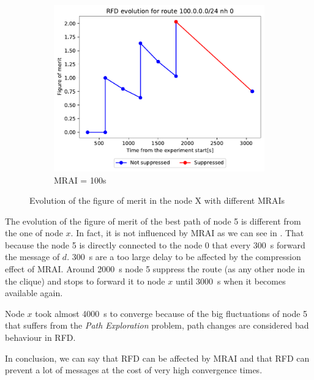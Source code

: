 \begin{figure}[h]
\begin{subfigure}[b]{0.3\textwidth}
     \end{subfigure}
     \hfill
     \begin{subfigure}[b]{0.3\textwidth}
         \centering
         \includegraphics[width=\textwidth]{images/RFD/clique/FigureOfMerit/mrai21_RFD_5_rfd_R1.pdf}
         \caption{MRAI = 100s}
         \label{fig:clique_5_mrai100}
     \end{subfigure}
        \caption{Evolution of the figure of merit in the node X with different MRAIs}
        \label{fig:clique_node5}
\end{figure}

The evolution of the figure of merit of the best path of node \num{5} is different
from the one of node $x$.
In fact, it is not influenced by \ac{MRAI} as we can see in .
That because the node \num{5} is directly connected to the node \num{0} that every
\SI{300}{\second} forward the message of $d$. \SI{300}{\second} are a too large
delay to be affected by the compression effect of \ac{MRAI}.
Around \SI{2000}{\second} node \num{5} suppress the route (as any other node in the
clique) and stops to forward it to node $x$ until \SI{3000}{\second} when it becomes
available again.

Node $x$ took almost \SI{4000}{\second} to converge because of the big fluctuations
of node \num{5} that suffers from the \textit{Path Exploration} problem, path
changes are considered bad behaviour in \ac{RFD}.

In conclusion, we can say that \ac{RFD} can be affected by \ac{MRAI} and
that \ac{RFD} can prevent a lot of messages at the cost of very high convergence
times.

